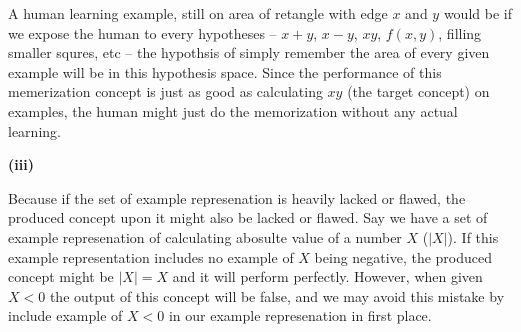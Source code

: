 \documentclass[12pt]{article}
\begin{document}
A human learning example, still on area of retangle with edge $x$ and $y$ would be if we expose the human to every hypotheses -- $x + y$, $x-y$, $xy$, $f(x, y)$, filling smaller squres, etc -- the hypothsis of simply remember the area of every given example will be in this hypothesis space. Since the performance of this memerization concept is just as good as calculating $xy$ (the target concept) on examples, the human might just do the memorization without any actual learning.\newline

\noindent\textbf{(iii)}

Because if the set of example represenation is heavily lacked or flawed, the produced concept upon it might also be lacked or flawed. Say we have a set of example represenation of calculating abosulte value of a number $X$ ($|X|$). If this example representation includes no example of $X$ being negative, the produced concept might be $|X| = X$ and it will perform perfectly. However, when given $X < 0$ the output of this concept will be false, and we may avoid this mistake by include example of $X<0$ in our example represenation in first place.


% 
% 
\end{document}
